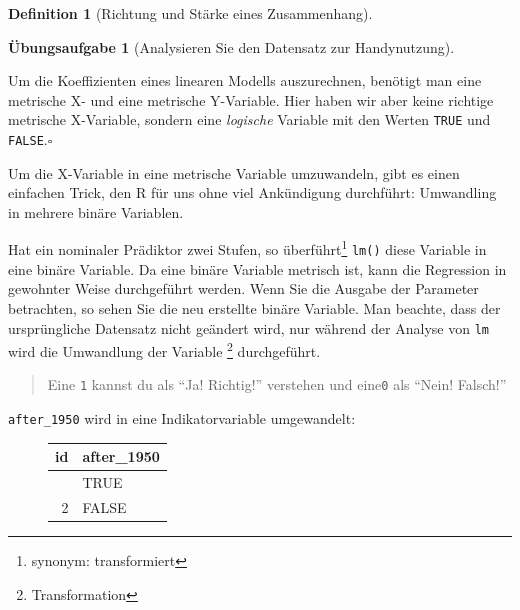 \documentclass[
  a4paper,
  DIV=11]{scrreprt}
\theoremstyle{definition}
\newtheorem{exercise}{Übungsaufgabe}[chapter]
\theoremstyle{definition}
\theoremstyle{definition}
\newtheorem{definition}{Definition}[chapter]
\theoremstyle{remark}
\begin{document}
\begin{definition}[Richtung und Stärke eines
Zusammenhang]
\begin{exercise}[Analysieren Sie den Datensatz zur
Handynutzung]
\begin{tcolorbox}[enhanced jigsaw, leftrule=.75mm, opacitybacktitle=0.6, colback=white, colframe=quarto-callout-important-color-frame, coltitle=black, colbacktitle=quarto-callout-important-color!10!white, opacityback=0, left=2mm, breakable, titlerule=0mm, toptitle=1mm, bottomtitle=1mm, rightrule=.15mm, title=\textcolor{quarto-callout-important-color}{\faExclamation}\hspace{0.5em}{Lineare Modelle verkraften nur metrische Variablen}, arc=.35mm, bottomrule=.15mm, toprule=.15mm]

Um die Koeffizienten eines linearen Modells auszurechnen, benötigt man
eine metrische X- und eine metrische Y-Variable. Hier haben wir aber
keine richtige metrische X-Variable\footnotemark{}, sondern eine
\emph{logische} Variable mit den Werten \texttt{TRUE} und
\texttt{FALSE}.\(\square\)

\end{tcolorbox}


Um die X-Variable in eine metrische Variable umzuwandeln, gibt es einen
einfachen Trick, den R für uns ohne viel Ankündigung durchführt:
Umwandling in mehrere binäre Variablen.

Hat ein nominaler Prädiktor zwei Stufen, so überführt\footnote{synonym:
  transformiert} \texttt{lm()} diese Variable in eine binäre Variable.
Da eine binäre Variable metrisch ist, kann die Regression in gewohnter
Weise durchgeführt werden. Wenn Sie die Ausgabe der Parameter
betrachten, so sehen Sie die neu erstellte binäre Variable. Man beachte,
dass der ursprüngliche Datensatz nicht geändert wird, nur während der
Analyse von \texttt{lm} wird die Umwandlung der Variable \footnote{Transformation}
durchgeführt.

\begin{quote}
{} Eine \texttt{1} kannst du als ``Ja! Richtig!'' verstehen
und eine\texttt{0} als ``Nein! Falsch!''
\end{quote}

\texttt{after\_1950} wird in eine Indikatorvariable umgewandelt:

\begin{figure}

\begin{minipage}{0.40\linewidth}

\begin{longtable}[]{@{}rl@{}}
\toprule\noalign{}
id & after\_1950 \\
\midrule\noalign{}
\endhead
\bottomrule\noalign{}
\endlastfoot
1 & TRUE \\
2 & FALSE \\
\end{longtable}


\end{minipage}
\end{figure}
\end{exercise}
\end{definition}
\end{document}
